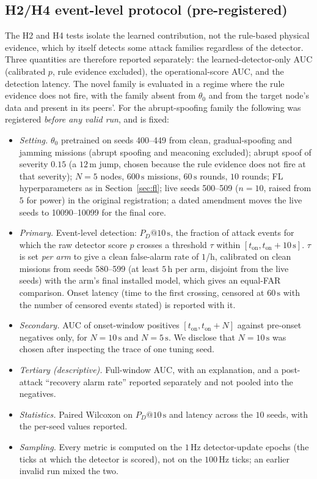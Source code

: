\documentclass[journal]{IEEEtran}
\begin{document}
\subsection{H2/H4 event-level protocol (pre-registered)}
\label{sec:h2prereg}
The H2 and H4 tests isolate the learned contribution, not the rule-based physical evidence, which by itself
detects some attack families regardless of the detector. Three quantities are therefore reported
separately: the learned-detector-only AUC (calibrated $p$, rule evidence excluded), the operational-score
AUC, and the detection latency. The novel family is evaluated in a regime where the rule evidence does
not fire, with the family absent from $\theta_0$ and from the target node's data and present in its peers'.
For the abrupt-spoofing family the following was registered \emph{before any valid run}, and is fixed:
\begin{itemize}
\item \emph{Setting.} $\theta_0$ pretrained on seeds 400--449 from clean, gradual-spoofing and jamming missions
  (abrupt spoofing and meaconing excluded); abrupt spoof of severity $0.15$ (a $12\,\mathrm{m}$ jump, chosen
  because the rule evidence does not fire at that severity); $N=5$ nodes, $600\,\mathrm{s}$ missions,
  $60\,\mathrm{s}$ rounds, $10$ rounds; FL hyperparameters as in Section~\ref{sec:fl}; live seeds 500--509
  ($n=10$, raised from $5$ for power) in the original registration; a dated amendment moves the live seeds to 10090--10099 for the final core.
\item \emph{Primary.} Event-level detection: $P_D@10\,\mathrm{s}$, the fraction of attack events for which the
  raw detector score $p$ crosses a threshold $\tau$ within $[t_{\mathrm{on}}, t_{\mathrm{on}}+10\,\mathrm{s}]$.
  $\tau$ is set \emph{per arm} to give a clean false-alarm rate of $1$/h, calibrated on clean missions from
  seeds 580--599 (at least $5\,\mathrm{h}$ per arm, disjoint from the live seeds) with the arm's final
  installed model, which gives an equal-FAR comparison. Onset latency (time to the first crossing, censored at
  $60\,\mathrm{s}$ with the number of censored events stated) is reported with it.
\item \emph{Secondary.} AUC of onset-window positives $[t_{\mathrm{on}}, t_{\mathrm{on}}+N]$ against pre-onset
  negatives only, for $N = 10\,\mathrm{s}$ and $N = 5\,\mathrm{s}$. We disclose that $N=10\,\mathrm{s}$ was
  chosen after inspecting the trace of one tuning seed.
\item \emph{Tertiary (descriptive).} Full-window AUC, with an explanation, and a post-attack ``recovery alarm
  rate'' reported separately and not pooled into the negatives.
\item \emph{Statistics.} Paired Wilcoxon on $P_D@10\,\mathrm{s}$ and latency across the $10$ seeds, with the
  per-seed values reported.
\item \emph{Sampling.} Every metric is computed on the $1\,\mathrm{Hz}$ detector-update epochs (the ticks at
  which the detector is scored), not on the $100\,\mathrm{Hz}$ ticks; an earlier invalid run mixed the two.
\end{itemize}
\end{document}
